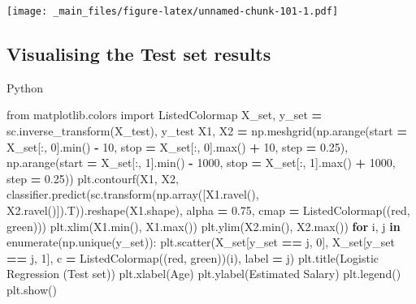\documentclass[
]{book}
\newenvironment{Shaded}{\begin{snugshade}}{\end{snugshade}}
\newcommand{\BuiltInTok}[1]{#1}
\newcommand{\ControlFlowTok}[1]{\textcolor[rgb]{0.13,0.29,0.53}{\textbf{#1}}}
\newcommand{\DecValTok}[1]{\textcolor[rgb]{0.00,0.00,0.81}{#1}}
\newcommand{\FloatTok}[1]{\textcolor[rgb]{0.00,0.00,0.81}{#1}}
\newcommand{\ImportTok}[1]{#1}
\newcommand{\KeywordTok}[1]{\textcolor[rgb]{0.13,0.29,0.53}{\textbf{#1}}}
\newcommand{\NormalTok}[1]{#1}
\newcommand{\OperatorTok}[1]{\textcolor[rgb]{0.81,0.36,0.00}{\textbf{#1}}}
\newcommand{\StringTok}[1]{\textcolor[rgb]{0.31,0.60,0.02}{#1}}
\theoremstyle{definition}
\theoremstyle{definition}
\theoremstyle{definition}
\theoremstyle{definition}
\theoremstyle{remark}
\begin{document}
\texttt{[image: \_main\_files/figure-latex/unnamed-chunk-101-1.pdf]}

\hypertarget{visualising-the-test-set-results-1}{%
\subsection{Visualising the Test set results}\label{visualising-the-test-set-results-1}}

Python

\begin{Shaded}
\begin{Highlighting}[]
\ImportTok{from}\NormalTok{ matplotlib.colors }\ImportTok{import}\NormalTok{ ListedColormap}
\NormalTok{X\_set, y\_set }\OperatorTok{=}\NormalTok{ sc.inverse\_transform(X\_test), y\_test}
\NormalTok{X1, X2 }\OperatorTok{=}\NormalTok{ np.meshgrid(np.arange(start }\OperatorTok{=}\NormalTok{ X\_set[:, }\DecValTok{0}\NormalTok{].}\BuiltInTok{min}\NormalTok{() }\OperatorTok{{-}} \DecValTok{10}\NormalTok{, stop }\OperatorTok{=}\NormalTok{ X\_set[:, }\DecValTok{0}\NormalTok{].}\BuiltInTok{max}\NormalTok{() }\OperatorTok{+} \DecValTok{10}\NormalTok{, step }\OperatorTok{=} \FloatTok{0.25}\NormalTok{),}
\NormalTok{                     np.arange(start }\OperatorTok{=}\NormalTok{ X\_set[:, }\DecValTok{1}\NormalTok{].}\BuiltInTok{min}\NormalTok{() }\OperatorTok{{-}} \DecValTok{1000}\NormalTok{, stop }\OperatorTok{=}\NormalTok{ X\_set[:, }\DecValTok{1}\NormalTok{].}\BuiltInTok{max}\NormalTok{() }\OperatorTok{+} \DecValTok{1000}\NormalTok{, step }\OperatorTok{=} \FloatTok{0.25}\NormalTok{))}
\NormalTok{plt.contourf(X1, X2, classifier.predict(sc.transform(np.array([X1.ravel(), X2.ravel()]).T)).reshape(X1.shape),}
\NormalTok{             alpha }\OperatorTok{=} \FloatTok{0.75}\NormalTok{, cmap }\OperatorTok{=}\NormalTok{ ListedColormap((}\StringTok{\textquotesingle{}red\textquotesingle{}}\NormalTok{, }\StringTok{\textquotesingle{}green\textquotesingle{}}\NormalTok{)))}
\NormalTok{plt.xlim(X1.}\BuiltInTok{min}\NormalTok{(), X1.}\BuiltInTok{max}\NormalTok{())}
\NormalTok{plt.ylim(X2.}\BuiltInTok{min}\NormalTok{(), X2.}\BuiltInTok{max}\NormalTok{())}
\ControlFlowTok{for}\NormalTok{ i, j }\KeywordTok{in} \BuiltInTok{enumerate}\NormalTok{(np.unique(y\_set)):}
\NormalTok{    plt.scatter(X\_set[y\_set }\OperatorTok{==}\NormalTok{ j, }\DecValTok{0}\NormalTok{], X\_set[y\_set }\OperatorTok{==}\NormalTok{ j, }\DecValTok{1}\NormalTok{], c }\OperatorTok{=}\NormalTok{ ListedColormap((}\StringTok{\textquotesingle{}red\textquotesingle{}}\NormalTok{, }\StringTok{\textquotesingle{}green\textquotesingle{}}\NormalTok{))(i), label }\OperatorTok{=}\NormalTok{ j)}
\NormalTok{plt.title(}\StringTok{\textquotesingle{}Logistic Regression (Test set)\textquotesingle{}}\NormalTok{)}
\NormalTok{plt.xlabel(}\StringTok{\textquotesingle{}Age\textquotesingle{}}\NormalTok{)}
\NormalTok{plt.ylabel(}\StringTok{\textquotesingle{}Estimated Salary\textquotesingle{}}\NormalTok{)}
\NormalTok{plt.legend()}
\NormalTok{plt.show()}
\end{Highlighting}
\end{Shaded}
\end{document}

